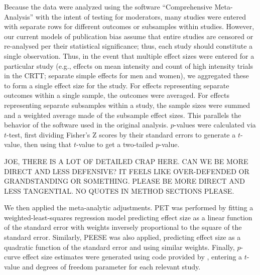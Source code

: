 \documentclass[man]{apa6}
\begin{document}
Because the data were analyzed using the software ``Comprehensive Meta-Analysis'' with the intent of testing for moderators, many studies were entered with separate rows for different outcomes or subsamples within studies. However, our current models of publication bias assume that entire studies are censored or re-analysed per their statistical significance; thus, each study should constitute a single observation. Thus, in the event that multiple effect sizes were entered for a particular study (e.g., effects on mean intensity and count of high intensity trials in the CRTT; separate simple effects for men and women), we aggregated these to form a single effect size for the study. For effects representing separate outcomes within a single sample, the outcomes were averaged. For effects representing separate subsamples within a study, the sample sizes were summed and a weighted average made of the subsample effect sizes. This parallels the behavior of the software used in the original analysis. $p$-values were calculated via $t$-test, first dividing Fisher's Z scores by their standard errors to generate a $t$-value, then using that $t$-value to get a two-tailed $p$-value.

\textsc{JOE, THERE IS A LOT OF DETAILED CRAP HERE.  CAN WE BE MORE DIRECT AND LESS DEFENSIVE?  IT FEELS LIKE OVER-DEFENDED OR GRANDSTANDING OR SOMETHING.  PLEASE BE MORE DIRECT AND LESS TANGENTIAL.  NO QUOTES IN METHOD SECTIONS PLEASE.}

We then applied the meta-analytic adjustments. PET was performed by fitting a weighted-least-squares regression model predicting effect size as a linear function of the standard error with weights inversely proportional to the square of the standard error. Similarly, PEESE was also applied, predicting effect size as a quadratic function of the standard error and using similar weights. Finally, $p$-curve effect size estimates were generated using code provided by \citet{Simonsohn:etal:2014}, entering a $t$-value and degrees of freedom parameter for each relevant study.

\end{document}
